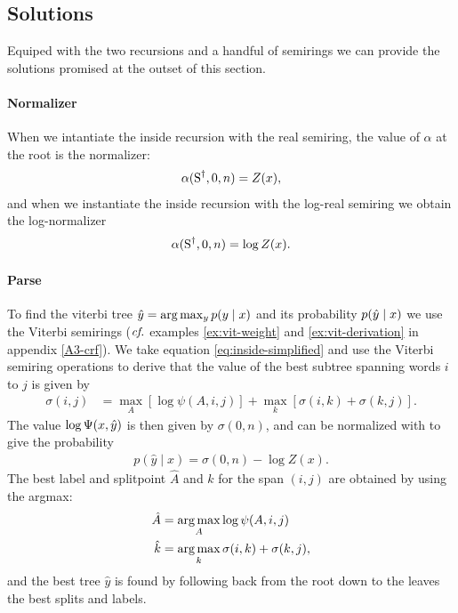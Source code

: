   \subsection{Solutions}
    Equiped with the two recursions and a handful of semirings we can provide the solutions promised at the outset of this section.

    \paragraph{Normalizer}
      When we intantiate the inside recursion with the real semiring, the value of $\alpha$ at the root is the normalizer:
      \begin{align*}
        \alpha(\text{S}^{\dagger}, 0, n) = Z(x),
      \end{align*}
      and when we instantiate the inside recursion with the log-real semiring we obtain the log-normalizer
      \begin{align*}
        \alpha(\text{S}^{\dagger}, 0, n) = \log Z(x).
      \end{align*}

    \paragraph{Parse}
      To find the viterbi tree $\hat{ y } = \arg \max_{ y } p(y  \mid x)$ and its probability $p(\hat{y} \mid x)$ we use the Viterbi semirings ($\emph{cf.}$ examples \ref{ex:vit-weight} and \ref{ex:vit-derivation} in appendix \ref{A3-crf}). We take equation \ref{eq:inside-simplified} and use the Viterbi semiring operations to derive that the value of the best subtree spanning words $i$ to $j$ is given by
      \begin{align}
        \label{eq:viterbi-score}
        \sigma(i,j)
          &= \max_{A} [ \log \psi(A, i, j) ] + \max_{k} [\sigma(i,k) + \sigma(k,j)].
      \end{align}
      The value $\log \Psi(x, \hat{y})$ is then given by $\sigma(0, n)$, and  can be normalized with to give the probability
      \begin{align}
        p(\hat{y} \mid x) = \sigma(0, n) - \log Z(x).
      \end{align}
      The best label and splitpoint $\hat{A}$ and $\hat{k}$ for the span $(i, j)$ are obtained by using the argmax:
      \begin{align}
        \label{eq:viterbi-tree}
        \hat{A} &= \operatorname*{arg\,max}_{ A  } \log \psi(A, i, j)  \\
        \hat{k} &= \operatorname*{arg\,max}_{ k } \sigma(i, k) + \sigma(k, j),
      \end{align}
      and the best tree $\hat{y}$ is found by following back from the root down to the leaves the best splits and labels.

